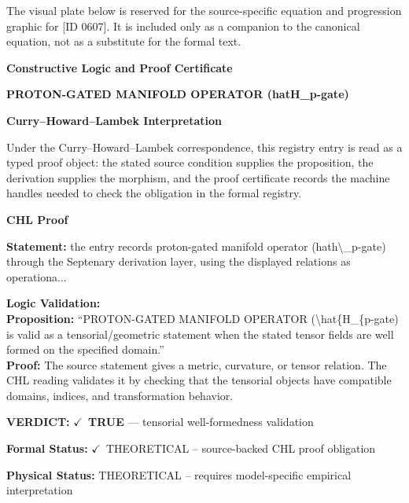 \begingroup\footnotesize\sloppy
The visual plate below is reserved for the source-specific equation and progression graphic for [ID 0607]. It is included only as a companion to the canonical equation, not as a substitute for the formal text.
\par\endgroup
\ifTZPDarkEdition
{}
\fi

\clearpage
\begingroup\tzpsupportsetup
\noindent\textbf{\fontsize{10.8pt}{12.8pt}\selectfont [ID 0607] Constructive Logic and Proof Certificate}\par
\noindent\textbf{\fontsize{10pt}{12pt}\selectfont PROTON-GATED MANIFOLD OPERATOR (hatH\_p-gate)}\par
\vspace{0.45em}
\begingroup
\footnotesize
\setlength{\parskip}{0.22em}
\setlength{\parindent}{0pt}
\noindent\textbf{Curry--Howard--Lambek Interpretation}\par
Under the Curry--Howard--Lambek correspondence, this registry entry is read as a typed proof
object: the stated source condition supplies the proposition, the derivation supplies the
morphism, and the proof certificate records the machine handles needed to check the obligation
in the formal registry.

\vspace{0.45em}
\noindent\textbf{CHL Proof}\par
\textbf{Statement:} the entry records proton-gated manifold operator (hath\textbackslash{}\_p-gate) through the Septenary
derivation layer, using the displayed relations as operationa...

\textbf{Logic Validation:}\\
\textbf{Proposition:} ``PROTON-GATED MANIFOLD OPERATOR (\textbackslash{}hat\{H\_\{p-gate) is valid as a tensorial/geometric
statement when the stated tensor fields are well formed on the specified domain.''\\
\textbf{Proof:} The source statement gives a metric, curvature, or tensor relation. The CHL reading
validates it by checking that the tensorial objects have compatible domains, indices,
and transformation behavior.

\textbf{VERDICT:} \ensuremath{\checkmark}\ \textbf{TRUE} --- tensorial well-formedness validation

\textbf{Formal Status:} \ensuremath{\checkmark}\ THEORETICAL -- source-backed CHL proof obligation

\textbf{Physical Status:} THEORETICAL -- requires model-specific empirical interpretation
\par\vspace{0.45em}
\par
\ifTZPDarkEdition
{}
\fi
\endgroup
\endgroup
